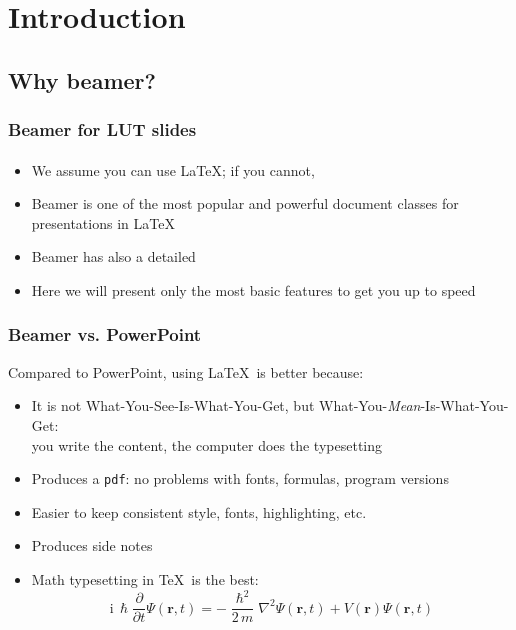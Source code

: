 \documentclass[light]{lutbeamer} %
\begin{document}
\section{Introduction}
\subsection{Why beamer?}
\begin{frame}
\frametitle{Beamer for LUT slides}
\framesubtitle{}
\begin{itemize}
\item We assume you can use \LaTeX; if you cannot,
\item Beamer is one of the most popular and powerful document classes for presentations in \LaTeX
\item Beamer has also a detailed
\item Here we will present only the most basic features to get you up to speed
\end{itemize}
\end{frame}

\begin{frame}
\frametitle{Beamer vs. PowerPoint}
Compared to PowerPoint, using \LaTeX\ is better because:
\begin{itemize}
\item It is not What-You-See-Is-What-You-Get, but
What-You-\emph{Mean}-Is-What-You-Get:\\
you write the content, the computer does the typesetting
\item Produces a \texttt{pdf}: no problems with fonts, formulas,
      program versions
\item Easier to keep consistent style, fonts, highlighting, etc.
\item Produces side notes
\item Math typesetting in \TeX\ is the best:
\begin{equation*}
\mathrm{i}\,\hslash\frac{\partial}{\partial t} \Psi(\mathbf{r},t) =
-\frac{\hslash^2}{2\,m}\nabla^2\Psi(\mathbf{r},t)
+ V(\mathbf{r})\Psi(\mathbf{r},t)
\end{equation*}

\end{itemize}
\end{frame}
\end{document}
